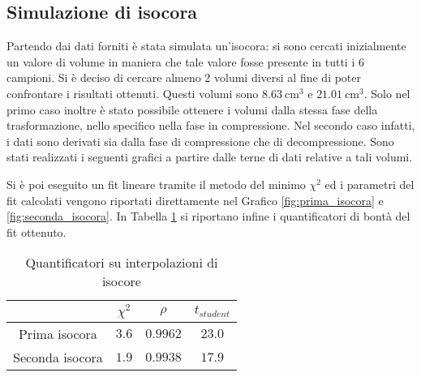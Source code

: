 \documentclass[a4paper,11pt,oneside]{article}
\begin{document}
\subsection{Simulazione di isocora}
Partendo dai dati forniti è stata simulata un'isocora: si sono cercati inizialmente un valore di volume in maniera che tale valore fosse presente in tutti i 6 campioni. Si è deciso di cercare almeno 2 volumi diversi al fine di poter confrontare i risultati ottenuti. Questi volumi sono $\SI{8.63}{\centi\meter\cubed}$ e $\SI{21.01}{\centi\meter\cubed}$. Solo nel primo caso inoltre è stato possibile ottenere i volumi dalla stessa fase della trasformazione, nello specifico nella fase in compressione. Nel secondo caso infatti, i dati sono derivati sia dalla fase di compressione che di decompressione.
Sono stati realizzati i seguenti grafici a partire dalle terne di dati relative a tali volumi.
\begin{figure}[h!]
    \centering
    \label{fig:isocore}
\end{figure}

Si è poi eseguito un fit lineare tramite il metodo del minimo $\chi^2$ ed i parametri del fit calcolati vengono riportati direttamente nel Grafico \ref{fig:prima_isocora} e \ref{fig:seconda_isocora}. In Tabella \ref{tab:quantificatori_isocore} si riportano infine i quantificatori di bontà del fit ottenuto.

\begin{table}[h!]
    \centering
    \begin{tabular}{|c|c|c|c|}
        \hline
         & $\chi^2$ & $\rho$ & $t_{student}$ \\ \hline
        \rowcolor[rgb]{0.85,0.85,0.85} Prima isocora & $3.6$ & $0.9962$ & $23.0$ \\ \hline
        Seconda isocora & $1.9$ & $0.9938$ & $17.9$ \\ \hline
    \end{tabular}
    \caption{Quantificatori su interpolazioni di isocore}
    \label{tab:quantificatori_isocore}
\end{table}
\end{document}
